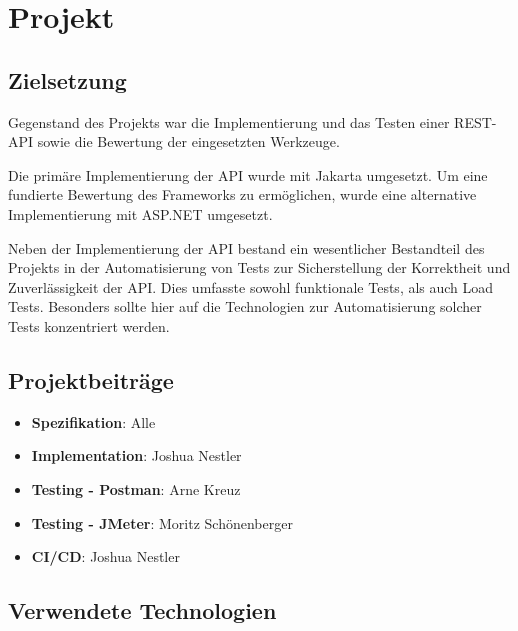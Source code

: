 \chapter{Projekt}

\section{Zielsetzung}

Gegenstand des Projekts war die Implementierung und das Testen einer REST-API sowie die Bewertung der eingesetzten Werkzeuge.

Die primäre Implementierung der API wurde mit Jakarta umgesetzt.
Um eine fundierte Bewertung des Frameworks zu ermöglichen, 
wurde eine alternative Implementierung mit ASP.NET umgesetzt.

Neben der Implementierung der API bestand ein wesentlicher Bestandteil des Projekts 
in der Automatisierung von Tests zur Sicherstellung der Korrektheit und Zuverlässigkeit der API.
Dies umfasste sowohl funktionale Tests, als auch Load Tests. 
Besonders sollte hier auf die Technologien zur Automatisierung solcher Tests konzentriert werden.

\section{Projektbeiträge}

\begin{itemize}
    \item \textbf{Spezifikation}: Alle
    \item \textbf{Implementation}: Joshua Nestler
    \item \textbf{Testing - Postman}: Arne Kreuz
    \item \textbf{Testing - JMeter}: Moritz Schönenberger
    \item \textbf{CI/CD}: Joshua Nestler
\end{itemize}

\section{Verwendete Technologien}

